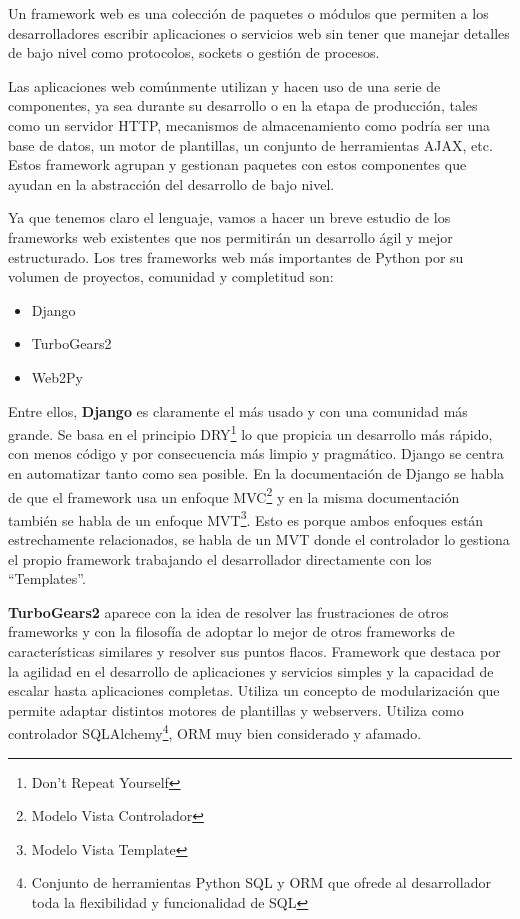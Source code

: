 Un framework web es una colección de paquetes o módulos que permiten a los desarrolladores escribir aplicaciones o servicios web sin tener que manejar detalles de bajo nivel como protocolos, sockets o gestión de procesos.

\bigskip
Las aplicaciones web comúnmente utilizan y hacen uso de una serie de componentes, ya sea durante su desarrollo o en la etapa de producción, tales como un servidor HTTP, mecanismos de almacenamiento como podría ser una base de datos, un motor de plantillas, un conjunto de herramientas AJAX, etc. Estos framework agrupan y gestionan paquetes con estos componentes que ayudan en la abstracción del desarrollo de bajo nivel.

\bigskip
Ya que tenemos claro el lenguaje, vamos a hacer un breve estudio de los frameworks web existentes que nos permitirán un desarrollo ágil y mejor estructurado. Los tres frameworks web más importantes de Python por su volumen de proyectos, comunidad y completitud son:


\begin{itemize}
  \item {Django}
  \item {TurboGears2}
  \item {Web2Py}
\end{itemize}


\bigskip
Entre ellos, \textbf{Django} es claramente el más usado y con una comunidad más grande. Se basa en el principio DRY\footnote{Don't Repeat Yourself} lo que propicia un desarrollo más rápido, con menos código y por consecuencia más limpio y pragmático. Django se centra en automatizar tanto como sea posible. En la documentación de Django se habla de que el framework usa un enfoque MVC\footnote{Modelo Vista Controlador}  y en la misma documentación también se habla de un enfoque MVT\footnote{Modelo Vista Template}. Esto es porque ambos enfoques están estrechamente relacionados, se habla de un MVT donde el controlador lo gestiona el propio framework trabajando el desarrollador directamente con los ``Templates''.

\bigskip
\textbf{TurboGears2} aparece con la idea de resolver las frustraciones de otros frameworks y con la filosofía de adoptar lo mejor de otros frameworks de características similares y resolver sus puntos flacos. Framework que destaca por la agilidad en el desarrollo de aplicaciones y servicios simples y la capacidad de escalar hasta aplicaciones completas. Utiliza un concepto de modularización que permite adaptar distintos motores de plantillas y webservers. Utiliza como controlador SQLAlchemy\footnote{Conjunto de herramientas Python SQL y ORM que ofrede al desarrollador toda la flexibilidad y funcionalidad de SQL}, ORM muy bien considerado y afamado.

